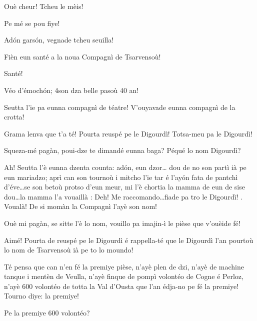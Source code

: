 \begin{drama}
\Pierrespeaks Ouè cheur! Tcheu le mèis!

\Marcospeaks Pe mé se pou fiye!

\Pierrespeaks Ad\'on gars\'on, vegnade tcheu seuilla!


\Joelspeaks Fièn eun santé a la noua Compagnì de Tsarvensoù!

\Tcheuttespeaks Santé!




\Paganspeaks Véo d'émoch\'on; 4son dza belle pasoù 40 an!

\Nevaouspeaks{} Seutta l'ie pa eunna compagnì de téatre! V'ouyavade eunna compagnì de la crotta!

\Paganspeaks Grama lenva que t'a té!  Pourta reuspé pe le Digourdì! Totsa-meu pa le Digourdì!

\Nevaousaspeaks Squeza-mé pagàn, poui-dze te dimandé eunna baga? Péqué lo nom Digourdì? 

\Paganspeaks{} Ah!  Seutta l'è eunna dzenta counta: ad\'on, eun dzor\ldots {} dou de no son partì ià pe eun mariadzo; aprì can son tournoù i mitcho l'ie tar é l'ay\'on fata de pantchì d'éve\ldots se son betoù protso d'eun meur, mi l'è chortia la mamma de eun de sise dou\ldots la mamma l'a vouaillà : \og Deh! Me raccomando\ldots fiade pa tro le Digourdì! \fg{} . Voualà! De si momàn la Compagnì l'ayè son nom!

\Nevaouspeaks Ouè mi pagàn, se sitte l'è lo nom, vouillo pa imajin-ì le pièse que v'ouèide fé!

\Paganspeaks Aimé! Pourta de reuspé pe le Digourdì é rappella-té que le Digourdì l'an pourtoù lo nom de Tsarvensoù ià pe to lo moundo!


\Paganspeaks Té pensa que can n'en fé la premiye pièse,  n’ayè plen de dzi, n’ayè de machine tanque i mentèn de Veulla, n'ayè finque de pompì volontéo de Cogne é Perloz, n’ayè 600 volontéo de totta la Val d'Ousta que l'an édja-no pe fé la premiye! Tourno diye: la premiye!

\Ledouspeaks {} Pe la premiye 600 volontéo? 


\end{drama}
